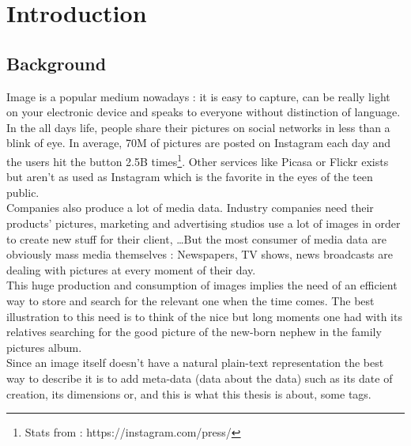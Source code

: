 
\chapter{Introduction} %

\label{Chapter1} %



\section{Background} %
\label{sec:background}

Image is a popular medium nowadays : it is easy to capture, can be really light on your electronic device and speaks to everyone without distinction of language.\\

In the all days life, people share their pictures on social networks in less than a blink of eye. In average, 70M of pictures are posted on Instagram each day and the users hit the  button 2.5B times\footnote{Stats from : https://instagram.com/press/}. Other services like Picasa or Flickr exists but aren't as used as Instagram which is the favorite in the eyes of the teen public.\\
Companies also produce a lot of media data. Industry companies need their products' pictures, marketing and advertising studios use a lot of images in order to create new stuff for their client, \dots But the most consumer of media data are obviously mass media themselves : Newspapers, TV shows, news broadcasts are dealing with pictures at every moment of their day.\\

This huge production and consumption of images implies the need of an efficient way to store and search for the relevant one when the time comes. The best illustration to this need is to think of the nice but long moments one had with its relatives searching for the good picture of the new-born nephew in the family pictures album.\\
Since an image itself doesn't have a natural plain-text representation the best way to describe it is to add meta-data (data about the data) such as its date of creation, its dimensions or, and this is what this thesis is about, some tags.\\

